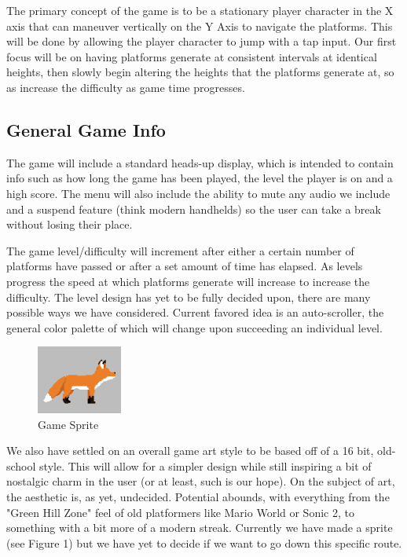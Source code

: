 \documentclass{article}
\begin{document}
The primary concept of the game is to be a stationary player character in the X axis that can maneuver vertically on the Y Axis to navigate the platforms. This will be done by allowing the player character to jump with a tap input. Our first focus will be on having platforms generate at consistent intervals at identical heights, then slowly begin altering the heights that the platforms generate at, so as increase the difficulty as game time progresses.\hfill \break 

\subsection{General Game Info}
The game will include a standard heads-up display, which is intended to contain info such as how long the game has been played, the level the player is on and a high score. The menu will also include the ability to mute any audio we include and a suspend feature (think modern handhelds) so the user can take a break without losing their place. \hfill \break

The game level/difficulty will increment after either a certain number of platforms have passed or after a set amount of time has elapsed. As levels progress the speed at which platforms generate will increase to increase the difficulty. The level design has yet to be fully decided upon, there are many possible ways we have considered. Current favored idea is an auto-scroller, the general color palette of which will change upon succeeding an individual level. \hfill \break
    \begin{figure}
        \centering
        \includegraphics[width=0.25\textwidth]{fox.png}
        \caption{Game Sprite}
    \end{figure}
    
We also have settled on an overall game art style to be based off of a 16 bit, old-school style. This will allow for a simpler design while still inspiring a bit of nostalgic charm in the user (or at least, such is our hope). On the subject of art, the aesthetic is, as yet, undecided. Potential abounds, with everything from the "Green Hill Zone" feel of old platformers like Mario World or Sonic 2, to something with a bit more of a modern streak. Currently we have made a sprite (see Figure 1) but we have yet to decide if we want to go down this specific route. \hfill \break
\end{document}

